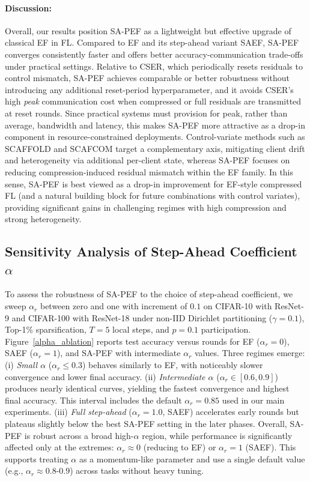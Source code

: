 \documentclass{article} %
\begin{document}
\paragraph{Discussion: } Overall, our results position SA-PEF as a lightweight but effective upgrade of classical EF in FL. Compared to EF and its step-ahead variant SAEF, SA-PEF converges consistently faster and offers better accuracy-communication trade-offs under practical settings. Relative to CSER, which periodically resets residuals to control mismatch, SA-PEF achieves comparable or better robustness without introducing any additional reset-period hyperparameter, and it avoids CSER’s high \emph{peak} communication cost when compressed or full residuals are transmitted at reset rounds. Since practical systems must provision for peak, rather than average, bandwidth and latency, this makes SA-PEF more attractive as a drop-in component in resource-constrained deployments. Control-variate methods such as SCAFFOLD and SCAFCOM target a complementary axis, mitigating client drift and heterogeneity via additional per-client state, whereas SA-PEF focuses on reducing compression-induced residual mismatch within the EF family. In this sense, SA-PEF is best viewed as a drop-in improvement for EF-style compressed FL (and a natural building block for future combinations with control variates), providing significant gains in challenging regimes with high compression and strong heterogeneity.

\subsection{Sensitivity Analysis of Step-Ahead Coefficient $\alpha$}
To assess the robustness of SA-PEF to the choice of step-ahead coefficient, we sweep $\alpha_r$ between zero and one with increment of $0.1$ on CIFAR-10 with ResNet-9 and CIFAR-100 with ResNet-18 under non-IID Dirichlet partitioning ($\gamma=0.1$), Top-1\% sparsification, $T=5$ local steps, and $p=0.1$ participation. Figure~\ref{alpha_ablation} reports test accuracy versus rounds for EF ($\alpha_r=0$), SAEF ($\alpha_r=1$), and SA-PEF with intermediate $\alpha_r$ values. Three regimes emerge: (i) \emph{Small $\alpha$} (\(\alpha_r \le 0.3\)) behaves similarly to EF, with noticeably slower convergence and lower final accuracy. (ii) \emph{Intermediate $\alpha$} (\(\alpha_r \in [0.6,0.9]\)) produces nearly identical curves, yielding the fastest convergence and highest final accuracy. This interval includes the default $\alpha_r=0.85$ used in our main experiments. (iii) \emph{Full step-ahead} (\(\alpha_r = 1.0\), SAEF) accelerates early rounds but plateaus slightly below the best SA-PEF setting in the later phases. Overall, SA-PEF is robust across a broad high-$\alpha$ region, while performance is significantly affected only at the extremes: $\alpha_r \approx 0$ (reducing to EF) or $\alpha_r = 1$ (SAEF). This supports treating $\alpha$ as a momentum-like parameter and use a single default value (e.g., $\alpha_r \approx 0.8$-$0.9$) across tasks without heavy tuning.
\end{document}
